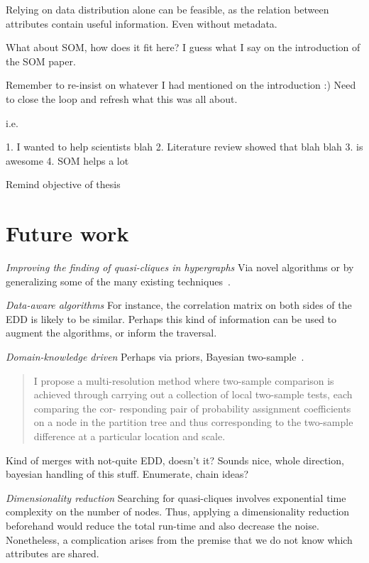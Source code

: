 
Relying on data distribution alone can be feasible, as the relation between attributes
contain useful information. Even without metadata.


What about SOM, how does it fit here? I guess what I say on the introduction 
of the SOM paper.

Remember to re-insist on whatever I had mentioned on the introduction :)
Need to close the loop and refresh what this was all about.

i.e.

1. I wanted to help scientists blah
2. Literature review showed that blah blah
3. \PresQ is awesome
4. SOM helps a lot

Remind objective of thesis

\section{Future work}




\emph{Improving the finding of quasi-cliques in hypergraphs} Via novel algorithms
    or by generalizing some of the many existing techniques~\cite{WU2015693}.

\emph{Data-aware algorithms} For instance, the correlation matrix on both sides of
    the \gls{EDD} is likely to be similar. Perhaps this kind of information can be used to
    augment the algorithms, or inform the traversal.
    
\emph{Domain-knowledge driven} Perhaps via priors, Bayesian two-sample~\cite{soriano2015bayesian}.
\begin{quote}
I propose a multi-resolution method where two-sample comparison is achieved
through carrying out a collection of local two-sample tests, each comparing the cor-
responding pair of probability assignment coefficients on a node in the partition tree
and thus corresponding to the two-sample difference at a particular location and
scale.
\end{quote}
Kind of merges with not-quite EDD, doesn't it? Sounds nice, whole direction, bayesian handling of this stuff.
Enumerate, chain ideas?

\emph{Dimensionality reduction} Searching for quasi-cliques involves exponential
    time complexity on the number of nodes. Thus, applying a dimensionality reduction beforehand
    would reduce the total run-time and also decrease the noise. Nonetheless, a complication
    arises from the premise that we do not know which attributes are shared.

